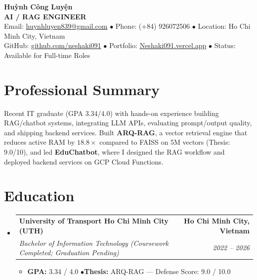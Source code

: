 \documentclass[10pt,letterpaper]{article}
\makeatletter
\newcommand{\resumeItemListStart}{\begin{itemize}[leftmargin=1.15em, label={\small$\bullet$}, itemsep=1.1pt, parsep=0pt, topsep=0.6pt, partopsep=0pt]}
\newcommand{\resumeItemListEnd}{\end{itemize}\vspace{-1pt}}
\newcommand{\resumeItem}[1]{\item \small{#1}}
\newcommand{\resumeSubheading}[4]{
  \item[]
  \begin{tabular*}{\textwidth}[t]{l@{\extracolsep{\fill}}r}
    \textbf{#1} & \textbf{\small #2} \\
    \textit{\small #3} & \textit{\small #4} \\
  \end{tabular*}\vspace{1pt}
}
\makeatother
\begin{document}
\begin{center}
  {\Large \textbf{Huỳnh Công Luyện}} \\ \vspace{2pt}
  {\large \textbf{\color{secondary}AI / RAG ENGINEER}}  \\ \vspace{2.5pt}
  \small{
    Email: \href{mailto:huynhluyen839@gmail.com}{huynhluyen839@gmail.com} \quad$\bullet$\quad
    Phone: (+84) 926072506 \quad$\bullet$\quad
    Location: Ho Chi Minh City, Vietnam
  } \\ \vspace{1.5pt}
  \small{
    GitHub: \href{https://github.com/neshaki091}{github.com/neshaki091} \quad$\bullet$\quad
    Portfolio: \href{https://Neshaki091.vercel.app}{Neshaki091.vercel.app} \quad$\bullet$\quad
    Status: Available for Full-time Roles
  }
\end{center}
\vspace{-3pt}

\section{Professional Summary}
\small{
Recent IT graduate (GPA 3.34/4.0) with hands-on experience building RAG/chatbot systems, integrating LLM APIs, evaluating prompt/output quality, and shipping backend services. Built \textbf{ARQ-RAG}, a vector retrieval engine that reduces active RAM by $18.8\times$ compared to FAISS on 5M vectors (Thesis: 9.0/10), and led \textbf{EduChatbot}, where I designed the RAG workflow and deployed backend services on GCP Cloud Functions.
}
\vspace{3.5pt}

\section{Education}
\begin{itemize}[leftmargin=0pt, label={}]
  \resumeSubheading
    {University of Transport Ho Chi Minh City (UTH)}{Ho Chi Minh City, Vietnam}
    {Bachelor of Information Technology \textnormal{(Coursework Completed; Graduation Pending)}}{2022 -- 2026}
    \resumeItemListStart
      \resumeItem{\textbf{GPA:} 3.34 / 4.0 \quad$\bullet$\quad \textbf{Thesis:} ARQ-RAG --- Defense Score: 9.0 / 10.0}
    \resumeItemListEnd
\end{itemize}
\vspace{0pt}
\end{document}
